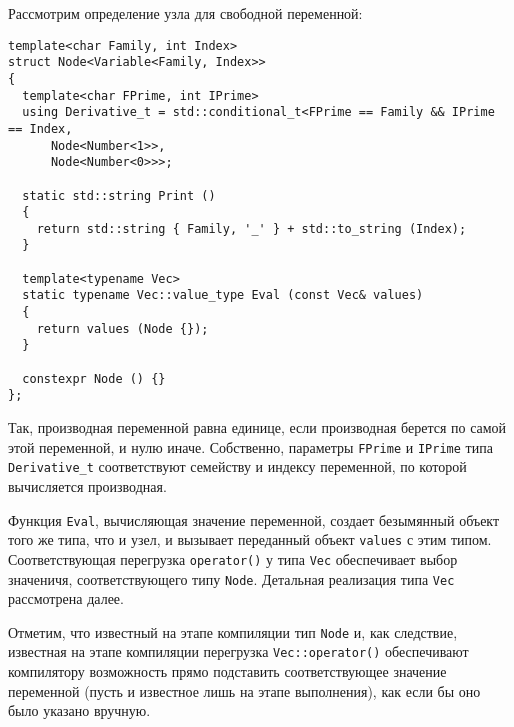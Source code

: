 \documentclass[11pt,a4paper]{article}
\begin{document}
Рассмотрим определение узла для свободной переменной:
\begin{lstlisting}
template<char Family, int Index>
struct Node<Variable<Family, Index>>
{
  template<char FPrime, int IPrime>
  using Derivative_t = std::conditional_t<FPrime == Family && IPrime == Index,
      Node<Number<1>>,
      Node<Number<0>>>;

  static std::string Print ()
  {
    return std::string { Family, '_' } + std::to_string (Index);
  }

  template<typename Vec>
  static typename Vec::value_type Eval (const Vec& values)
  {
    return values (Node {});
  }

  constexpr Node () {}
};
\end{lstlisting}

Так, производная переменной равна единице, если производная берется по самой этой переменной,
и нулю иначе. Собственно, параметры \texttt{FPrime} и \texttt{IPrime} типа \texttt{Derivative\_t}
соответствуют семейству и индексу переменной, по которой вычисляется производная.

Функция \texttt{Eval}, вычисляющая значение переменной, создает безымянный объект того же типа,
что и узел, и вызывает переданный объект \texttt{values} с этим типом. Соответствующая перегрузка
\texttt{operator()} у типа \texttt{Vec} обеспечивает выбор значеничя, соответствующего типу
\texttt{Node}. Детальная реализация типа \texttt{Vec} рассмотрена далее.

Отметим, что известный на этапе компиляции тип \texttt{Node} и, как следствие, известная на этапе
компиляции перегрузка \texttt{Vec::operator()} обеспечивают компилятору возможность прямо подставить
соответствующее значение переменной (пусть и известное лишь на этапе выполнения), как если бы оно
было указано вручную.
\end{document}

